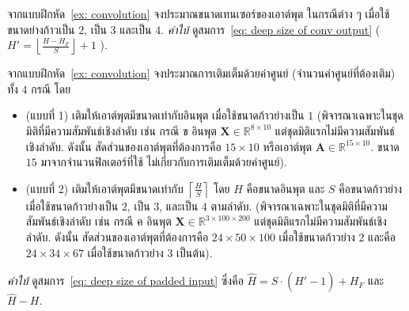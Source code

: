 \begin{Exercise}
	\label{ex: convolution strides}
	
จากแบบฝึกหัด~\ref{ex: convolution}
จงประมาณขนาดเทนเซอร์ของเอาต์พุต ในกรณีต่าง ๆ เมื่อใช้ขนาดย่างก้าวเป็น $2$, เป็น $3$ และเป็น $4$.
\textit{คำใบ้} ดูสมการ~\ref{eq: deep size of conv output}  (
$H' = \left\lfloor \frac{H - H_F}{S} \right\rfloor + 1$
).





\end{Exercise}

\begin{Exercise}
	\label{ex: convolution padding}

จากแบบฝึกหัด~\ref{ex: convolution}
จงประมาณการเติมเต็มด้วยค่าศูนย์ (จำนวนค่าศูนย์ที่ต้องเติม) ทั้ง $4$ กรณี
โดย
\begin{itemize}
	\item (แบบที่ 1) เติมให้เอาต์พุตมีขนาดเท่ากับอินพุต เมื่อใช้ขนาดก้าวย่างเป็น $1$ (พิจารณาเฉพาะในชุดมิติที่มีความสัมพันธ์เชิงลำดับ เช่น กรณี ข อินพุต $\bm{X} \in \mathbb{R}^{8 \times 10}$ แต่ชุดมิติแรกไม่มีความสัมพันธ์เชิงลำดับ.
	ดังนั้น สัดส่วนของเอาต์พุตที่ต้องการคือ $15 \times 10$ หรือเอาต์พุต $\bm{A} \in \mathbb{R}^{15 \times 10}$. ขนาด $15$ มาจากจำนวนฟิลเตอร์ที่ใช้ ไม่เกี่ยวกับการเติมเต็มด้วยค่าศูนย์). 
	\item (แบบที่ 2) เติมให้เอาต์พุตมีขนาดเท่ากับ $\left\lceil\frac{H}{S}\right\rceil$
	โดย $H$ คือขนาดอินพุต และ $S$ คือขนาดก้าวย่าง
	เมื่อใช้ขนาดก้าวย่างเป็น $2$, เป็น $3$, และเป็น $4$ ตามลำดับ.
	(พิจารณาเฉพาะในชุดมิติที่มีความสัมพันธ์เชิงลำดับ เช่น กรณี ค อินพุต $\bm{X} \in \mathbb{R}^{3 \times 100 \times 200}$ แต่ชุดมิติแรกไม่มีความสัมพันธ์เชิงลำดับ. 
	ดังนั้น สัดส่วนของเอาต์พุตที่ต้องการคือ $24 \times 50 \times 100$ เมื่อใช้ขนาดก้าวย่าง $2$ และคือ $24 \times 34 \times 67$ เมื่อใช้ขนาดก้าวย่าง $3$ เป็นต้น).
\end{itemize}
\textit{คำใบ้} ดูสมการ~\ref{eq: deep size of padded input}  
ซึ่งคือ $\hat{H} = S \cdot (\hat{H}' - 1) + H_F$
และ $\hat{H} - H$.

\end{Exercise}



